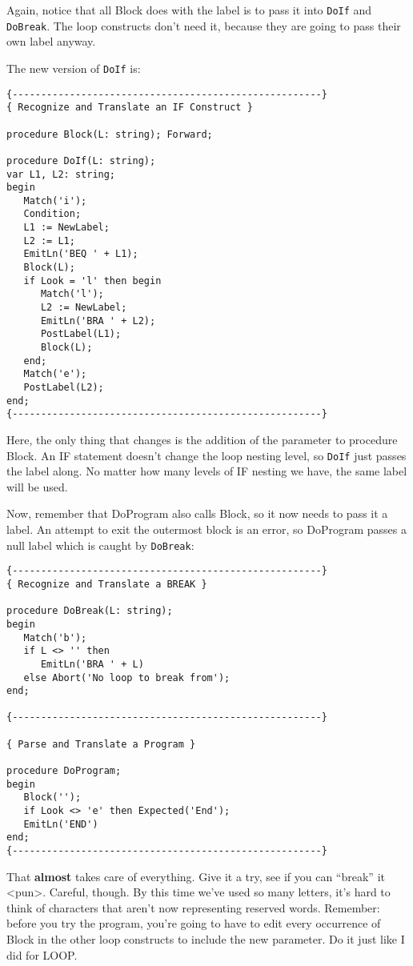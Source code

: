 Again, notice  that  all Block does with the label is to pass it into {\tt DoIf} and {\tt DoBreak}. The  loop  constructs  don't  need it, because they are going to pass their own label anyway.

The new version of {\tt DoIf} is:

\begin{verbatim}
{------------------------------------------------------}
{ Recognize and Translate an IF Construct }

procedure Block(L: string); Forward;

procedure DoIf(L: string);
var L1, L2: string;
begin
   Match('i');
   Condition;
   L1 := NewLabel;
   L2 := L1;
   EmitLn('BEQ ' + L1);
   Block(L);
   if Look = 'l' then begin
      Match('l');
      L2 := NewLabel;
      EmitLn('BRA ' + L2);
      PostLabel(L1);
      Block(L);
   end;
   Match('e');
   PostLabel(L2);
end;
{------------------------------------------------------}
\end{verbatim}

Here, the  only  thing  that  changes  is  the addition  of  the parameter to procedure Block. An IF statement doesn't change the loop  nesting level, so {\tt DoIf} just passes the  label  along. No matter how many levels of IF nesting we have, the same label will be used.

Now, remember that DoProgram also calls Block, so it now needs to pass it a label. An  attempt  to  exit the outermost block is an error, so DoProgram  passes  a  null  label  which  is  caught by {\tt DoBreak}:

\begin{verbatim}
{------------------------------------------------------}
{ Recognize and Translate a BREAK }

procedure DoBreak(L: string);
begin
   Match('b');
   if L <> '' then
      EmitLn('BRA ' + L)
   else Abort('No loop to break from');
end;

{------------------------------------------------------}

{ Parse and Translate a Program }

procedure DoProgram;
begin
   Block('');
   if Look <> 'e' then Expected('End');
   EmitLn('END')
end;
{------------------------------------------------------}
\end{verbatim}

That {\bfseries almost} takes care of everything. Give it a try, see if you can ``break'' it <pun>. Careful, though. By this time  we've used so many letters, it's hard to think of characters that aren't now representing  reserved  words. Remember:  before  you  try the program, you're going to have to edit every occurrence of Block in the other loop constructs to include the new parameter. Do  it just like I did for LOOP.

